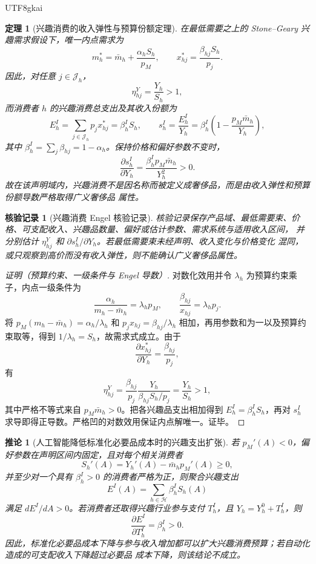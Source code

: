 \documentclass[12pt,a4paper,openany]{report}
\newtheorem{theorem}{定理}[chapter]
\newtheorem{corollary}{推论}[chapter]
\newtheorem{Certificate}{核验记录}[chapter]
\begin{document}
\begin{CJK*}{UTF8}{gkai}
\begin{theorem}[兴趣消费的收入弹性与预算份额定理]
\label{thm:interest-luxury-engel}
在最低需要之上的 Stone--Geary 兴趣需求假设下，唯一内点需求为
\[
  m_h^{*}
  =\bar m_h+\frac{\alpha_h S_h}{p_M},
  \qquad
  x_{hj}^{*}
  =\frac{\beta_{hj}S_h}{p_j}.
\]
因此，对任意 \(j\in\mathcal J_h\)，
\[
  \eta_{hj}^{Y}
  =\frac{Y_h}{S_h}>1,
\]
而消费者 \(h\) 的兴趣消费总支出及其收入份额为
\[
  E_h^I
  =\sum_{j\in\mathcal J_h}p_jx_{hj}^{*}
  =\beta_h^I S_h,
  \qquad
  s_h^I
  =\frac{E_h^I}{Y_h}
  =\beta_h^I\left(1-\frac{p_M\bar m_h}{Y_h}\right),
\]
其中 \(\beta_h^I=\sum_j\beta_{hj}=1-\alpha_h\)。保持价格和偏好参数不变时，
\[
  \frac{\partial s_h^I}{\partial Y_h}
  =\frac{\beta_h^I p_M\bar m_h}{Y_h^2}>0.
\]
故在该声明域内，兴趣消费不是因名称而被定义成奢侈品，而是由收入弹性和预算份额导数严格取得广义奢侈品
属性。
\end{theorem}

\begin{Certificate}[兴趣消费 Engel 核验记录]
核验记录保存产品域、最低需要束、价格、可支配收入、兴趣品数量、偏好或估计参数、需求系统与适用收入区间，
并分别估计 \(\eta_{hj}^{Y}\) 和 \(\partial s_h^I/\partial Y_h\)。若最低需要束未经声明、收入变化与价格变化
混同，或只观察到高价而没有收入弹性，则不能确认广义奢侈品属性。
\end{Certificate}

\begin{proof}[证明（预算约束、一级条件与 Engel 导数）]
对数化效用并令 \(\lambda_h\) 为预算约束乘子，内点一级条件为
\[
  \frac{\alpha_h}{m_h-\bar m_h}=\lambda_hp_M,
  \qquad
  \frac{\beta_{hj}}{x_{hj}}=\lambda_hp_j.
\]
将
\(
  p_M(m_h-\bar m_h)=\alpha_h/\lambda_h
\)
和
\(
  p_jx_{hj}=\beta_{hj}/\lambda_h
\)
相加，再用参数和为一以及预算约束取等，得到 \(1/\lambda_h=S_h\)，故需求式成立。由于
\[
  \frac{\partial x_{hj}^{*}}{\partial Y_h}=\frac{\beta_{hj}}{p_j},
\]
有
\[
  \eta_{hj}^{Y}
  =\frac{\beta_{hj}}{p_j}\frac{Y_h}{\beta_{hj}S_h/p_j}
  =\frac{Y_h}{S_h}>1,
\]
其中严格不等式来自 \(p_M\bar m_h>0\)。把各兴趣品支出相加得到 \(E_h^I=\beta_h^IS_h\)，再对
\(s_h^I\) 求导即得正导数。严格凹的对数效用保证内点解唯一。证毕。
\end{proof}

\begin{corollary}[人工智能降低标准化必要品成本时的兴趣支出扩张]
\label{cor:ai-interest-expenditure-expansion}
若 \(p_M'(A)<0\)，偏好参数在声明区间内固定，且对每个相关消费者
\[
  S_h'(A)
  =Y_h'(A)-\bar m_hp_M'(A)\ge0,
\]
并至少对一个具有 \(\beta_h^I>0\) 的消费者严格为正，则聚合兴趣支出
\[
  E^I(A)=\sum_{h\in\mathcal H}\beta_h^IS_h(A)
\]
满足 \(dE^I/dA>0\)。若消费者还取得兴趣行业参与支付 \(T_h^I\)，且
\(Y_h=Y_h^0+T_h^I\)，则
\[
  \frac{\partial E^I}{\partial T_h^I}=\beta_h^I>0.
\]
因此，标准化必要品成本下降与参与收入增加都可以扩大兴趣消费预算；若自动化造成的可支配收入下降超过必要品
成本下降，则该结论不成立。
\end{corollary}


\end{CJK*}
\end{document}
